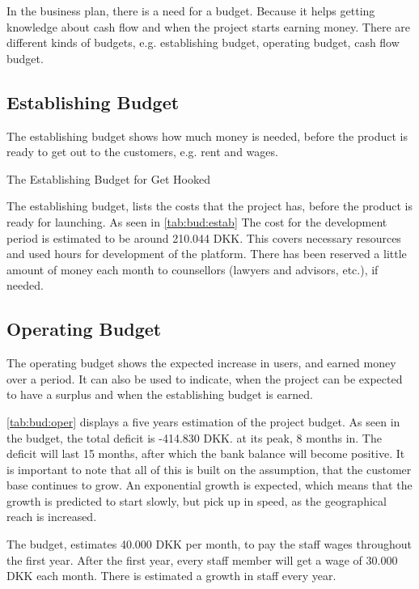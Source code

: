 In the business plan, there is a need for a budget. Because it helps getting knowledge about cash flow and when the project starts earning money. There are different kinds of budgets, e.g. establishing budget, operating budget, cash flow budget.


\subsection{Establishing Budget}
The establishing budget shows how much money is needed, before the product is ready to get out to the customers, e.g. rent and wages.


\begin{table}[H]
\centering
\caption{The Establishing Budget for Get Hooked}
\label{tab:bud:estab}

\end{table}

The establishing budget, lists the costs that the project has, before the product is ready for launching. As seen in \autoref{tab:bud:estab} The cost for the development period is estimated to be around 210.044 DKK. This covers necessary resources and used hours for development of the platform. There has been reserved a little amount of money each month to counsellors (lawyers and advisors, etc.), if needed.

\subsection{Operating Budget}

The operating budget shows the expected increase in users, and earned money over a period. It can also be used to indicate, when the project can be expected to have a surplus and when the establishing budget is earned.

\autoref{tab:bud:oper} displays a five years estimation of the project budget. As seen in the budget, the total deficit is -414.830 DKK. at its peak, 8 months in. The deficit will last 15 months, after which the bank balance will become positive. It is important to note that all of this is built on the assumption, that the customer base continues to grow. An exponential  growth is expected, which means that the growth is predicted to start slowly, but pick up in speed, as the geographical reach is increased.

The budget, estimates 40.000 DKK per month, to pay the staff wages throughout the first year. After the first year, every staff member will get a wage of 30.000 DKK each month. There is estimated a growth in staff every year.

